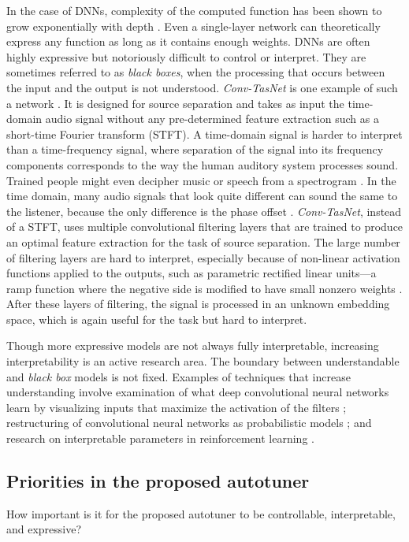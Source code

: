 In the case of DNNs, complexity of the computed function has been shown to grow exponentially with depth \cite{raghu2017expressive}. Even a single-layer network can theoretically express any function as long as it contains enough weights. DNNs are often highly expressive but notoriously difficult to control or interpret. They are sometimes referred to as \textit{black boxes}, when the processing that occurs between the input and the output is not understood. \textit{Conv-TasNet} is one example of such a network \cite{luo2019conv}. It is designed for source separation and takes as input the time-domain audio signal without any pre-determined feature extraction such as a short-time Fourier transform (STFT). A time-domain signal is harder to interpret than a time-frequency signal, where separation of the signal into its frequency  components corresponds to the way the human auditory system processes sound. Trained people might even decipher music or speech from a spectrogram \cite[][Ch.~3, p.~41]{raphael-i547}. In the time domain, many audio signals that look quite different can sound the same to the listener, because the only difference is the phase offset \cite{engel2020ddsp}. \textit{Conv-TasNet}, instead of a STFT, uses multiple convolutional filtering layers that are trained to produce an optimal feature extraction for the task of source separation. The large number of filtering layers are hard to interpret, especially because of non-linear activation functions applied to the outputs, such as parametric rectified linear units---a ramp function where the negative side is modified to have small nonzero weights \cite{he2015delving}. After these layers of filtering, the signal is processed in an unknown embedding space, which is again useful for the task but hard to interpret.

Though more expressive models are not always fully interpretable, increasing interpretability is an active research area. The boundary between understandable and \textit{black box} models is not fixed. Examples of techniques that increase understanding involve examination of what deep convolutional neural networks learn by visualizing inputs that maximize the activation of the filters \cite{qin2018convolutional}; restructuring of convolutional neural networks as probabilistic models \cite{patel2016probabilistic}; and research on interpretable parameters in reinforcement learning \cite{verma2018programmatically}. 

\subsection{Priorities in the proposed autotuner}
How important is it for the proposed autotuner to be controllable, interpretable, and expressive?

